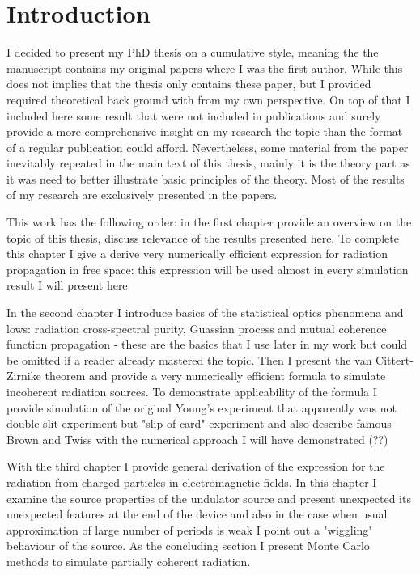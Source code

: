 \chapter{Introduction}

I decided to present my PhD thesis on a cumulative style, meaning the the manuscript contains my original papers where I was the first author. While this does not implies that the thesis only contains these paper, but I provided required theoretical back ground with from my own perspective. On top of that I included here some result that were not included in publications and surely provide a more comprehensive insight on my research the topic than the format of a regular publication could afford. Nevertheless, some material from the paper inevitably repeated in the main text of this thesis, mainly it is the theory part as it was need to better illustrate basic principles of the theory. Most of the results of my research are exclusively presented in the papers.

This work has the following order: in the first chapter provide an overview on the topic of this thesis, discuss relevance of the results presented here. To complete this chapter I give a derive very numerically efficient expression for radiation propagation in free space: this expression will be used almost in every simulation result I will present here. 

In the second chapter I introduce basics of the statistical optics phenomena and lows: radiation cross-spectral purity, Guassian process and mutual coherence function propagation - these are the basics that I use later in my work but could be omitted if a reader already mastered the topic. Then I present the van Cittert-Zirnike theorem and provide a very numerically efficient formula to simulate incoherent radiation sources. To demonstrate applicability of the formula I provide simulation of the original Young's experiment that apparently was not double slit experiment but "slip of card" experiment and also describe famous Brown and Twiss with the numerical approach I will have demonstrated (??)

With the third chapter I provide general derivation of the expression for the radiation from charged particles in electromagnetic fields. In this chapter I examine the source properties of the undulator source and present unexpected its unexpected features at the end of the device and also in the case when usual approximation of large number of periods is weak I point out a "wiggling" behaviour of the source. As the concluding section I present Monte Carlo methods to simulate partially coherent radiation.

